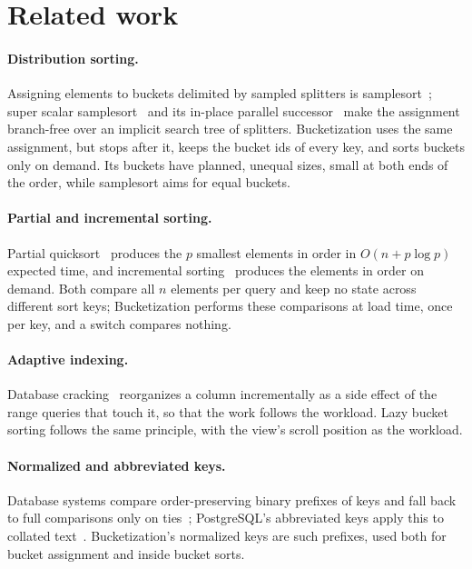 \documentclass[11pt]{article}
\theoremstyle{definition}
\begin{document}
\section{Related work}\label{sec:related}

\paragraph{Distribution sorting.} Assigning elements to buckets delimited by
sampled splitters is samplesort~\cite{frazer1970samplesort}; super scalar
samplesort~\cite{sanders2004superscalar} and its in-place parallel
successor~\cite{axtmann2017ips4o} make the assignment branch-free over an
implicit search tree of splitters. Bucketization uses the same assignment, but
stops after it, keeps the bucket ids of every key, and sorts buckets only on
demand. Its buckets have planned, unequal sizes, small at both ends of the
order, while samplesort aims for equal buckets.

\paragraph{Partial and incremental sorting.} Partial
quicksort~\cite{martinez2004partial} produces the $p$ smallest elements in
order in $O(n + p\log p)$ expected time, and incremental
sorting~\cite{paredes2006incremental} produces the elements in order on demand.
Both compare all $n$ elements per query and keep no state across different
sort keys; Bucketization performs these comparisons at load time, once per key,
and a switch compares nothing.

\paragraph{Adaptive indexing.} Database cracking~\cite{idreos2007cracking}
reorganizes a column incrementally as a side effect of the range queries that
touch it, so that the work follows the workload. Lazy bucket sorting follows
the same principle, with the view's scroll position as the workload.

\paragraph{Normalized and abbreviated keys.} Database systems compare
order-preserving binary prefixes of keys and fall back to full comparisons only
on ties~\cite{graefe2006sorting}; PostgreSQL's abbreviated keys apply this to
collated text~\cite{postgres95}. Bucketization's normalized keys are such
prefixes, used both for bucket assignment and inside bucket sorts.
\end{document}
